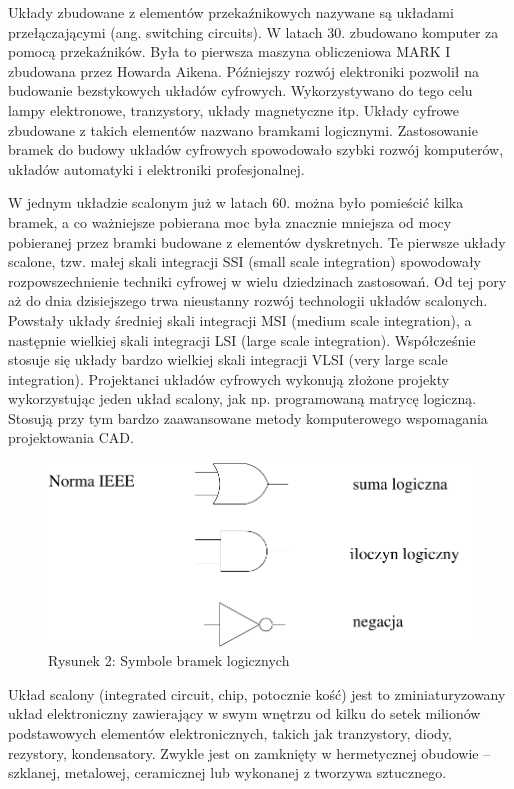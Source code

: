 \documentclass[a4paper,11pt]{article}
\begin{document}
 Układy zbudowane z elementów przekaźnikowych nazywane są układami przełączającymi (ang. switching circuits).  W latach 30. zbudowano komputer za pomocą przekaźników. Była to pierwsza maszyna obliczeniowa MARK I zbudowana przez Howarda Aikena. Późniejszy rozwój elektroniki pozwolił na budowanie bezstykowych układów cyfrowych. Wykorzystywano do tego celu lampy elektronowe, tranzystory, układy magnetyczne itp. Układy cyfrowe zbudowane z takich elementów nazwano bramkami logicznymi. Zastosowanie bramek do budowy układów cyfrowych spowodowało szybki rozwój komputerów, układów automatyki i elektroniki profesjonalnej. 

W jednym układzie scalonym już w latach 60. można było pomieścić kilka bramek, a co ważniejsze pobierana moc była znacznie mniejsza od mocy pobieranej przez bramki budowane z elementów dyskretnych. Te pierwsze układy scalone, tzw. małej skali integracji SSI (small scale integration) spowodowały rozpowszechnienie techniki cyfrowej w wielu dziedzinach zastosowań. Od tej pory aż do dnia dzisiejszego trwa nieustanny rozwój technologii układów scalonych. Powstały układy średniej skali integracji MSI (medium scale integration), a następnie wielkiej skali integracji LSI (large scale integration). Współcześnie stosuje się układy bardzo wielkiej skali integracji VLSI (very large scale integration). Projektanci układów cyfrowych wykonują złożone projekty wykorzystując jeden układ scalony, jak np. programowaną matrycę logiczną. Stosują przy tym bardzo zaawansowane metody komputerowego wspomagania projektowania CAD.

\begin{figure}[!htb]
\centerline{\includegraphics[scale=0.6]{symbole-bramek.pdf}}
\caption{Rysunek 2: Symbole bramek logicznych}
\label{fig:symboleBramek}
\end{figure}

  Układ scalony (integrated circuit, chip, potocznie kość) jest to zminiaturyzowany układ elektroniczny zawierający w swym wnętrzu od kilku do setek milionów podstawowych elementów elektronicznych, takich jak tranzystory, diody, rezystory, kondensatory. Zwykle jest on zamknięty w hermetycznej obudowie -- szklanej, metalowej, ceramicznej lub wykonanej z tworzywa sztucznego.
\end{document}
